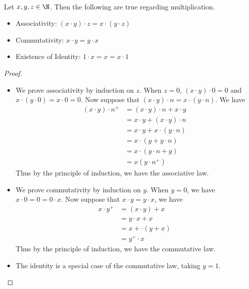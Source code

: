 \documentclass[a4paper]{article}
\begin{document}
\begin{prp}{}{}\\
Let $x,y,z\in\N$. Then the following are true regarding multiplication. 
\begin{itemize}
\item Associativity: $(x\cdot y)\cdot z=x\cdot(y\cdot z)$
\item Commutativity: $x\cdot y=y\cdot x$
\item Existence of Identity: $1\cdot x=x=x\cdot 1$
\end{itemize}
\begin{proof}\\
\begin{itemize}
\item We prove associativity by induction on $z$. When $z=0$, $(x\cdot y)\cdot 0=0$ and $x\cdot(y\cdot 0)=x\cdot 0=0$. Now suppose that $(x\cdot y)\cdot n=x\cdot(y\cdot n)$. We have
\begin{align*}
(x\cdot y)\cdot n^+&=(x\cdot y)\cdot n+x\cdot y \tag{Definition of Multiplication}\\
&=x\cdot y+(x\cdot y)\cdot n \tag{Commutativity of Addition}\\
&=x\cdot y+x\cdot(y\cdot n) \tag{Induction Hypothesis}\\
&=x\cdot(y+y\cdot n) \tag{Distributivity}\\
&=x\cdot(y\cdot n+y) \tag{Commutativity of Addition}\\
&=x(y\cdot n^+) \tag{Definition of Multiplication}
\end{align*}
Thus by the principle of induction, we have the associative law. 
\item We prove commutativity by induction on $y$. When $y=0$, we have $x\cdot0=0=0\cdot x$. Now suppose that $x\cdot y=y\cdot x$, we have
\begin{align*}
x\cdot y^+&=(x\cdot y)+x \tag{Definition of Multiplication}\\
&=y\cdot x+x \tag{Induction Hypothesis}\\
&=x+\cdot(y+x) \tag{Commutativity of Addition}\\
&=y^+\cdot x \tag{Distributivity}
\end{align*}
Thus by the principle of induction, we have the commutative law. 
\item The identity is a special case of the commutative law, taking $y=1$. 
\end{itemize}
\end{proof}
\end{prp}
\end{document}
